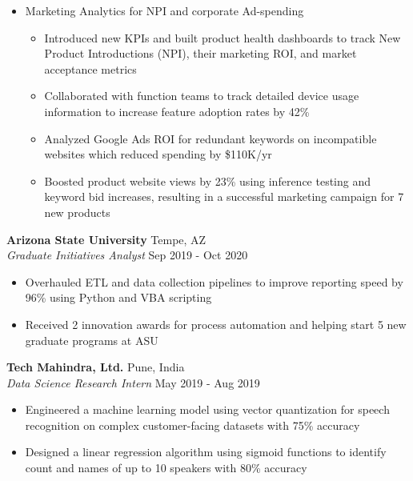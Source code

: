 \documentclass[a4paper]{article}
\begin{document}
\begin{itemize}
\begin{itemize}
        \end{itemize}
    \item Marketing Analytics for NPI and corporate Ad-spending
    \vspace{-1mm}
        \begin{itemize} \itemsep 1pt
        \item Introduced new KPIs and built product health dashboards to track New Product Introductions (NPI), their marketing ROI, and market acceptance metrics
        \item Collaborated with function teams to track detailed device usage information to increase feature adoption rates by 42\%
        \item Analyzed Google Ads ROI for redundant keywords on incompatible websites which reduced spending by \$110K/yr
        \item Boosted product website views by 23\% using inference testing and keyword bid increases, resulting in a successful marketing campaign for 7 new products
        \end{itemize}
\end{itemize}

\textbf{Arizona State University} \hfill Tempe, AZ\\
\textit{Graduate Initiatives Analyst} \hfill Sep 2019 - Oct 2020\\
\vspace{-1mm}
\begin{itemize} \itemsep 1pt
    \item Overhauled ETL and data collection pipelines to improve reporting speed by 96\% using Python and VBA scripting
    \item Received 2 innovation awards for process automation and helping start 5 new graduate programs at ASU
\end{itemize}

\textbf{Tech Mahindra, Ltd.} \hfill Pune, India\\
\textit{Data Science Research Intern} \hfill May 2019 - Aug 2019\\
\vspace{-1mm}
\begin{itemize} \itemsep 1pt
	\item Engineered a machine learning model using vector quantization for speech recognition on complex customer-facing datasets with 75\% accuracy
	\item Designed a linear regression algorithm using sigmoid functions to identify count and names of up to 10 speakers with 80\% accuracy
\end{itemize}
\end{document}
